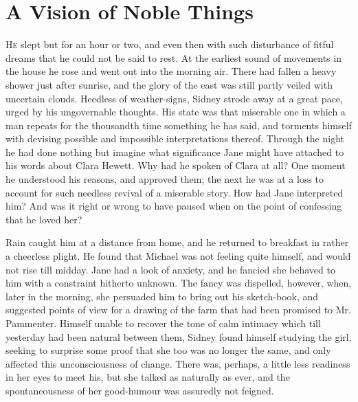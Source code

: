 \chapter{A Vision of Noble Things}

\textsc{He} slept but for an hour or two, and even then with such
disturbance of fitful dreams that he could not be said to rest. At the
earliest sound of movements in the house he rose and went out into the
morning air. There had fallen a heavy shower just after sunrise, and the
glory of the east was still partly veiled with uncertain clouds.
Heedless of weather-signs, Sidney strode away at a great pace, urged by
his ungovernable thoughts. His state was that miserable one in which a
man repeats for the thousandth time something he has said, and torments
himself with devising possible and impossible interpretations thereof.
Through the night he had done nothing but imagine what significance Jane
might have attached to his words {}about Clara Hewett. Why had he spoken
of Clara at all? One moment he understood his reasons, and approved
them; the next he was at a loss to account for such needless revival of
a miserable story. How had Jane interpreted him? And was it right or
wrong to have paused when on the point of confessing that he loved her?

Rain caught him at a distance from home, and he returned to breakfast in
rather a cheerless plight. He found that Michael was not feeling quite
himself, and would not rise till midday. Jane had a look of anxiety, and
he fancied she behaved to him with a constraint hitherto unknown. The
fancy was dispelled, however, when, later in the morning, she persuaded
him to bring out his sketch-book, and suggested points of view for a
drawing of the farm that had been promised to Mr. Pammenter. Himself
unable to recover the tone of calm intimacy which till yesterday had
been natural between them, Sidney found himself studying the girl,
seeking to surprise some proof that she too was no longer the {}same,
and only affected this unconsciousness of change. There was, perhaps, a
little less readiness in her eyes to meet his, but she talked as
naturally as ever, and the spontaneousness of her good-humour was
assuredly not feigned.

